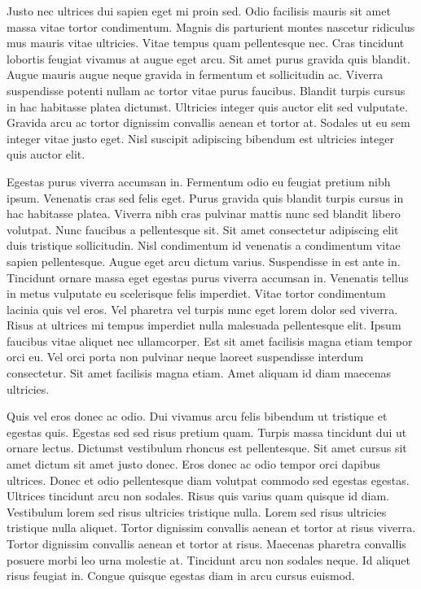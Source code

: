\documentclass[11pt,a4paper]{article}
\begin{document}
Justo nec ultrices dui sapien eget mi proin sed. Odio facilisis mauris sit amet massa vitae tortor condimentum. Magnis dis parturient montes nascetur ridiculus mus mauris vitae ultricies. Vitae tempus quam pellentesque nec. Cras tincidunt lobortis feugiat vivamus at augue eget arcu. Sit amet purus gravida quis blandit. Augue mauris augue neque gravida in fermentum et sollicitudin ac. Viverra suspendisse potenti nullam ac tortor vitae purus faucibus. Blandit turpis cursus in hac habitasse platea dictumst. Ultricies integer quis auctor elit sed vulputate. Gravida arcu ac tortor dignissim convallis aenean et tortor at. Sodales ut eu sem integer vitae justo eget. Nisl suscipit adipiscing bibendum est ultricies integer quis auctor elit.

Egestas purus viverra accumsan in. Fermentum odio eu feugiat pretium nibh ipsum. Venenatis cras sed felis eget. Purus gravida quis blandit turpis cursus in hac habitasse platea. Viverra nibh cras pulvinar mattis nunc sed blandit libero volutpat. Nunc faucibus a pellentesque sit. Sit amet consectetur adipiscing elit duis tristique sollicitudin. Nisl condimentum id venenatis a condimentum vitae sapien pellentesque. Augue eget arcu dictum varius. Suspendisse in est ante in. Tincidunt ornare massa eget egestas purus viverra accumsan in. Venenatis tellus in metus vulputate eu scelerisque felis imperdiet. Vitae tortor condimentum lacinia quis vel eros. Vel pharetra vel turpis nunc eget lorem dolor sed viverra. Risus at ultrices mi tempus imperdiet nulla malesuada pellentesque elit. Ipsum faucibus vitae aliquet nec ullamcorper. Est sit amet facilisis magna etiam tempor orci eu. Vel orci porta non pulvinar neque laoreet suspendisse interdum consectetur. Sit amet facilisis magna etiam. Amet aliquam id diam maecenas ultricies.

Quis vel eros donec ac odio. Dui vivamus arcu felis bibendum ut tristique et egestas quis. Egestas sed sed risus pretium quam. Turpis massa tincidunt dui ut ornare lectus. Dictumst vestibulum rhoncus est pellentesque. Sit amet cursus sit amet dictum sit amet justo donec. Eros donec ac odio tempor orci dapibus ultrices. Donec et odio pellentesque diam volutpat commodo sed egestas egestas. Ultrices tincidunt arcu non sodales. Risus quis varius quam quisque id diam. Vestibulum lorem sed risus ultricies tristique nulla. Lorem sed risus ultricies tristique nulla aliquet. Tortor dignissim convallis aenean et tortor at risus viverra. Tortor dignissim convallis aenean et tortor at risus. Maecenas pharetra convallis posuere morbi leo urna molestie at. Tincidunt arcu non sodales neque. Id aliquet risus feugiat in. Congue quisque egestas diam in arcu cursus euismod.
\end{document}
